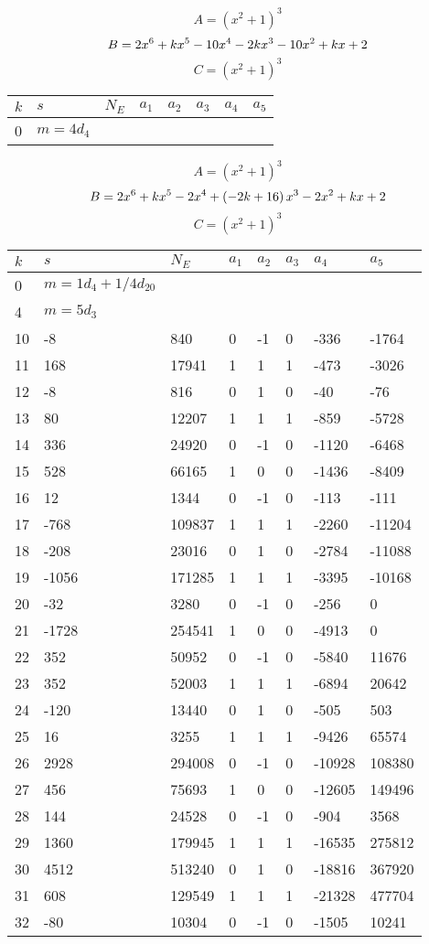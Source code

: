 \documentclass{amsart}
\begin{document}
$$A=(x^2
 + 1)^{3}$$
$$B=2\*x^6
 + k\*x^5
 - 10\*x^4
 - 2\*k\*x^3
 - 10\*x^2
 + k\*x
 + 2$$
$$C=(x^2
 + 1)^{3}$$
\begin{longtable}{|l|l|l|lllll|}
\hline
$k$ & $s$ & $N_E$ & $a_1$ & $a_2$ & $a_3$ & $a_4$ & $a_5$\\
\hline
0&$m=4d_{4}$&&\multicolumn{5}{c|}{}\\
\hline
\end{longtable}
$$A=(x^2
 + 1)^{3}$$
$$B=2\*x^6
 + k\*x^5
 - 2\*x^4
 + \left(-2\*k
 + 16\right) \*x^3
 - 2\*x^2
 + k\*x
 + 2$$
$$C=(x^2
 + 1)^{3}$$
\begin{longtable}{|l|l|l|lllll|}
\hline
$k$ & $s$ & $N_E$ & $a_1$ & $a_2$ & $a_3$ & $a_4$ & $a_5$\\
\hline
0&$m=1d_{4}+1/4d_{20}$&&\multicolumn{5}{c|}{}\\
4&$m=5d_{3}$&&\multicolumn{5}{c|}{}\\
10&-8&840&0&-1&0&-336&-1764\\
11&168&17941&1&1&1&-473&-3026\\
12&-8&816&0&1&0&-40&-76\\
13&80&12207&1&1&1&-859&-5728\\
14&336&24920&0&-1&0&-1120&-6468\\
15&528&66165&1&0&0&-1436&-8409\\
16&12&1344&0&-1&0&-113&-111\\
17&-768&109837&1&1&1&-2260&-11204\\
18&-208&23016&0&1&0&-2784&-11088\\
19&-1056&171285&1&1&1&-3395&-10168\\
20&-32&3280&0&-1&0&-256&0\\
21&-1728&254541&1&0&0&-4913&0\\
22&352&50952&0&-1&0&-5840&11676\\
23&352&52003&1&1&1&-6894&20642\\
24&-120&13440&0&1&0&-505&503\\
25&16&3255&1&1&1&-9426&65574\\
26&2928&294008&0&-1&0&-10928&108380\\
27&456&75693&1&0&0&-12605&149496\\
28&144&24528&0&-1&0&-904&3568\\
29&1360&179945&1&1&1&-16535&275812\\
30&4512&513240&0&1&0&-18816&367920\\
31&608&129549&1&1&1&-21328&477704\\
32&-80&10304&0&-1&0&-1505&10241\\

\end{longtable}
\end{document}
